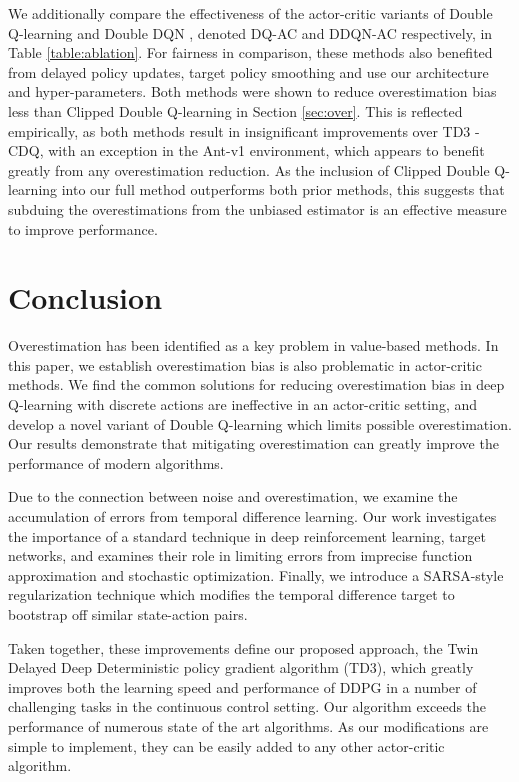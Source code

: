 \documentclass{article}
\begin{document}
We additionally compare the effectiveness of the actor-critic variants of Double Q-learning \cite{hasselt2010double} and Double DQN \cite{DoubleDQN}, denoted DQ-AC and DDQN-AC respectively, in Table \ref{table:ablation}. For fairness in comparison, these methods also benefited from delayed policy updates, target policy smoothing and use our architecture and hyper-parameters. Both methods were shown to reduce overestimation bias less than Clipped Double Q-learning in Section \ref{sec:over}. This is reflected empirically, as both methods result in insignificant improvements over TD3 - CDQ, with an exception in the Ant-v1 environment, which appears to benefit greatly from any overestimation reduction. As the inclusion of Clipped Double Q-learning into our full method outperforms both prior methods, this suggests that subduing the overestimations from the unbiased estimator is an effective measure to improve performance. 

\section{Conclusion}


Overestimation has been identified as a key problem in value-based methods. In this paper, we establish overestimation bias is also problematic in actor-critic methods. We find the common solutions for reducing overestimation bias in deep Q-learning with discrete actions are ineffective in an actor-critic setting, and develop a novel variant of Double Q-learning which limits possible overestimation. Our results demonstrate that mitigating overestimation can greatly improve the performance of modern algorithms. 

Due to the connection between noise and overestimation, we examine the accumulation of errors from temporal difference learning. Our work investigates the importance of a standard technique in deep reinforcement learning, target networks, and examines their role in limiting errors from imprecise function approximation and stochastic optimization. Finally, we introduce a SARSA-style regularization technique which modifies the temporal difference target to bootstrap off similar state-action pairs. 

Taken together, these improvements define our proposed approach, the Twin Delayed Deep Deterministic policy gradient algorithm (TD3), which greatly improves both the learning speed and performance of DDPG in a number of challenging tasks in the continuous control setting. Our algorithm exceeds the performance of numerous state of the art algorithms. As our modifications are simple to implement, they can be easily added to any other actor-critic algorithm. 
\end{document}
